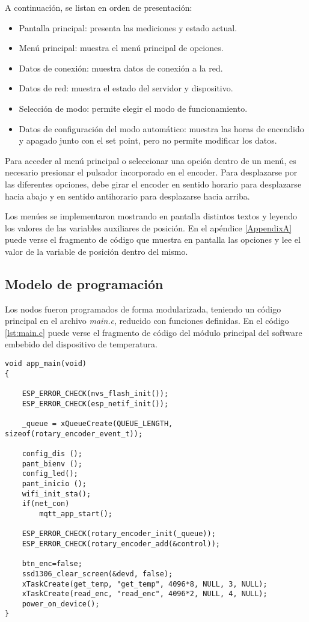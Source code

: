 A continuación, se listan en orden de presentación:

\begin{itemize}
	\item Pantalla principal: presenta las mediciones y estado actual.
	\item Menú principal: muestra el menú principal de opciones.
	\item Datos de conexión: muestra datos de conexión a la red.
	\item Datos de red: muestra el estado del servidor y dispositivo.
	\item Selección de modo: permite elegir el modo de funcionamiento.
	\item Datos de configuración del modo automático: muestra las horas de encendido y apagado junto con el set point, pero no permite modificar los datos.
\end{itemize}

Para acceder al menú principal o seleccionar una opción dentro de un menú, es necesario presionar el pulsador incorporado en el encoder. Para desplazarse por las diferentes opciones, debe girar el encoder en sentido horario para desplazarse hacia abajo y en sentido antihorario para desplazarse hacia arriba.

Los menúes se implementaron mostrando en pantalla distintos textos y leyendo los valores de las variables auxiliares de posición. En el apéndice \ref{AppendixA} puede verse el fragmento de código que muestra en pantalla las opciones y lee el valor de la variable de posición dentro del mismo.

\subsection{Modelo de programación}

Los nodos fueron programados de forma modularizada, teniendo un código principal en el archivo \textit{main.c}, reducido con funciones definidas. En el código \ref{lst:main.c} puede verse el fragmento de código del módulo principal del software embebido del dispositivo de temperatura.

\begin{lstlisting}[caption={Código de \textit{main.c}.}, label={lst:main.c}]
void app_main(void)
{
    
	ESP_ERROR_CHECK(nvs_flash_init());
	ESP_ERROR_CHECK(esp_netif_init());

	_queue = xQueueCreate(QUEUE_LENGTH, sizeof(rotary_encoder_event_t));

	config_dis ();
	pant_bienv ();
	config_led();
	pant_inicio ();
	wifi_init_sta();
    if(net_con)
		mqtt_app_start();
	
	ESP_ERROR_CHECK(rotary_encoder_init(_queue));
	ESP_ERROR_CHECK(rotary_encoder_add(&control));
	
	btn_enc=false;
	ssd1306_clear_screen(&devd, false);
	xTaskCreate(get_temp, "get_temp", 4096*8, NULL, 3, NULL);
	xTaskCreate(read_enc, "read_enc", 4096*2, NULL, 4, NULL);
	power_on_device();
}
\end{lstlisting}

